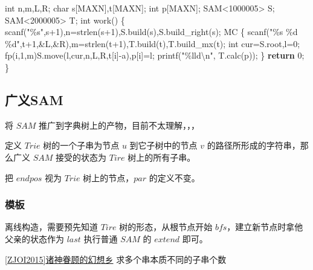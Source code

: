 \documentclass[
]{article}
\newenvironment{Shaded}{}{}
\newcommand{\CharTok}[1]{\textcolor[rgb]{0.25,0.44,0.63}{#1}}
\newcommand{\ControlFlowTok}[1]{\textcolor[rgb]{0.00,0.44,0.13}{\textbf{#1}}}
\newcommand{\DataTypeTok}[1]{\textcolor[rgb]{0.56,0.13,0.00}{#1}}
\newcommand{\DecValTok}[1]{\textcolor[rgb]{0.25,0.63,0.44}{#1}}
\newcommand{\NormalTok}[1]{#1}
\newcommand{\SpecialCharTok}[1]{\textcolor[rgb]{0.25,0.44,0.63}{#1}}
\newcommand{\StringTok}[1]{\textcolor[rgb]{0.25,0.44,0.63}{#1}}
\begin{document}
\begin{Shaded}
\begin{Highlighting}[]
\DataTypeTok{int}\NormalTok{ n,m,L,R;}
\DataTypeTok{char}\NormalTok{ s[MAXN],t[MAXN];}
\DataTypeTok{int}\NormalTok{  p[MAXN];}
\NormalTok{SAM\textless{}}\DecValTok{1000005}\NormalTok{\textgreater{} S;}
\NormalTok{SAM\textless{}}\DecValTok{2000005}\NormalTok{\textgreater{} T;}
\DataTypeTok{int}\NormalTok{ work()}
\NormalTok{\{}
\NormalTok{    scanf(}\StringTok{"}\SpecialCharTok{\%s}\StringTok{"}\NormalTok{,s+}\DecValTok{1}\NormalTok{),n=strlen(s+}\DecValTok{1}\NormalTok{),S.build(s),S.build\_right(s);}
\NormalTok{    MC}
\NormalTok{    \{}
\NormalTok{        scanf(}\StringTok{"}\SpecialCharTok{\%s}\StringTok{ }\SpecialCharTok{\%d}\StringTok{ }\SpecialCharTok{\%d}\StringTok{"}\NormalTok{,t+}\DecValTok{1}\NormalTok{,\&L,\&R),m=strlen(t+}\DecValTok{1}\NormalTok{),T.build(t),T.build\_mx(t);}
        \DataTypeTok{int}\NormalTok{ cur=S.root,l=}\DecValTok{0}\NormalTok{;}
\NormalTok{        fp(i,}\DecValTok{1}\NormalTok{,m)S.move(l,cur,n,L,R,t[i]{-}}\CharTok{\textquotesingle{}a\textquotesingle{}}\NormalTok{),p[i]=l;}
\NormalTok{        printf(}\StringTok{"}\SpecialCharTok{\%lld\textbackslash{}n}\StringTok{"}\NormalTok{, T.calc(p));}
\NormalTok{    \}}
    \ControlFlowTok{return} \DecValTok{0}\NormalTok{;}
\NormalTok{\}}
\end{Highlighting}
\end{Shaded}

\hypertarget{ux5e7fux4e49sam}{%
\subsection{广义SAM}\label{ux5e7fux4e49sam}}

将 \(SAM\) 推广到字典树上的产物，目前不太理解，，，

定义 \(Trie\) 树的一个子串为节点 \(u\) 到它子树中的节点 \(v\)
的路径所形成的字符串，那么广义 \(SAM\) 接受的状态为 \(Tire\)
树上的所有子串。

把 \(endpos\) 视为 \(Trie\) 树上的节点，\(par\) 的定义不变。

\hypertarget{ux6a21ux677f-9}{%
\subsubsection{模板}\label{ux6a21ux677f-9}}

离线构造，需要预先知道 \(Tire\) 树的形态，从根节点开始
\(bfs\)，建立新节点时拿他父亲的状态作为 \(last\) 执行普通 \(SAM\) 的
\(extend\) 即可。

\href{https://www.luogu.org/problem/P3346}{{[}ZJOI2015{]}诸神眷顾的幻想乡}
求多个串本质不同的子串个数
\end{document}
